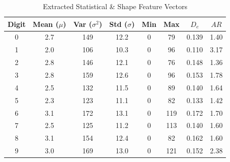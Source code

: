 \begin{table}[t]
\centering
\scriptsize
\setlength{\tabcolsep}{4.8pt}
\renewcommand{\arraystretch}{0.88}
\caption{Extracted Statistical \& Shape Feature Vectors}
\label{tab:features}
\begin{tabular}{cccccccc}
\toprule
\textbf{Digit} & \textbf{Mean ($\mu$)} & \textbf{Var ($\sigma^2$)} & \textbf{Std ($\sigma$)} & \textbf{Min} & \textbf{Max} & \textbf{$D_e$} & \textbf{$AR$} \\
\midrule
0 & 2.7 & 149 & 12.2 & 0 & 79 & 0.139 & 1.40 \\
1 & 2.0 & 106 & 10.3 & 0 & 96 & 0.110 & 3.17 \\
2 & 2.8 & 146 & 12.1 & 0 & 76 & 0.148 & 1.36 \\
3 & 2.8 & 159 & 12.6 & 0 & 96 & 0.153 & 1.78 \\
4 & 2.5 & 132 & 11.5 & 0 & 89 & 0.140 & 1.64 \\
5 & 2.3 & 123 & 11.1 & 0 & 82 & 0.133 & 1.42 \\
6 & 3.1 & 172 & 13.1 & 0 & 119 & 0.172 & 1.70 \\
7 & 2.5 & 125 & 11.2 & 0 & 113 & 0.140 & 1.60 \\
8 & 3.1 & 154 & 12.4 & 0 & 82 & 0.162 & 1.60 \\
9 & 3.0 & 169 & 13.0 & 0 & 121 & 0.152 & 2.38 \\
\bottomrule
\end{tabular}
\end{table}
